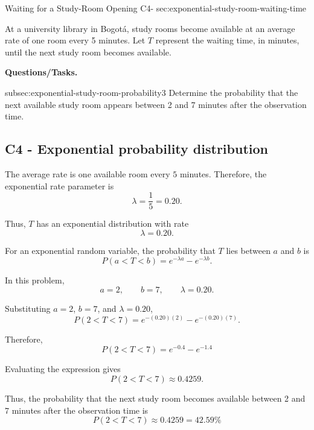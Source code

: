 	\sectionScored
	{Waiting for a Study-Room Opening}
	{C4-}
	{sec:exponential-study-room-waiting-time}
	{
		At a university library in Bogotá, study rooms become available at an
		average rate of one room every 5 minutes. Let \(T\) represent the
		waiting time, in minutes, until the next study room becomes available.
		
		\textbf{Questions/Tasks.}
		\begin{enumerate}
			\CriterionTask
			{subsec:exponential-study-room-probability}{3}
			{Determine the probability that the next available study room appears
				between 2 and 7 minutes after the observation time. }
		\end{enumerate}
		
		\label{subsec:exponential-study-room-probability}
		\subsection*{C4 - Exponential probability distribution }
		
		The average rate is one available room every \(5\) minutes.
		Therefore, the exponential rate parameter is
		\[
		\lambda=\frac{1}{5}=0.20.
		\]
		
		Thus, \(T\) has an exponential distribution with rate
		\[
		\lambda=0.20.
		\]
		
		For an exponential random variable, the probability that \(T\) lies
		between \(a\) and \(b\) is
		\[
		P(a<T<b)=e^{-\lambda a}-e^{-\lambda b}.
		\]
		
		In this problem,
		\[
		a=2,\qquad b=7,\qquad \lambda=0.20.
		\]
		
		
		Substituting \(a=2\), \(b=7\), and \(\lambda=0.20\),
		\[
		P(2<T<7)
		=e^{-(0.20)(2)}-e^{-(0.20)(7)}.
		\]
		
		Therefore,
		\[
		P(2<T<7)
		=e^{-0.4}-e^{-1.4}
		\]
		
		Evaluating the expression gives
		\[
		P(2<T<7)
		\approx0.4259.
		\]
		
		Thus, the probability that the next study room becomes available
		between 2 and 7 minutes after the observation time is
		\[
		\boxed{P(2<T<7)\approx0.4259=42.59\%}
		\]
	}
	

	
	
	

